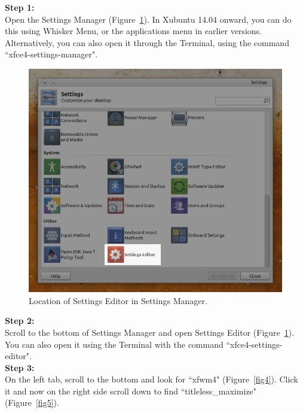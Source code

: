 \documentclass[12pt, a4paper]{article}
\begin{document}
\noindent \textbf{Step 1:}\\

\noindent Open the Settings Manager (Figure~\ref{fig3}). In Xubuntu 14.04 onward, you can do this using Whisker Menu, or the applications menu in earlier versions. Alternatively, you can also open it through the Terminal, using the command ``xfce4-settings-manager".

\begin{figure}[h]
  \centering
  \includegraphics[width=1\textwidth]{imgs/3settingsmanager.png}
  \caption{Location of Settings Editor in Settings Manager.}
  \label{fig3}
\end{figure}

\newpage
\noindent \textbf{Step 2:}\\

\noindent Scroll to the bottom of Settings Manager and open Settings Editor (Figure~\ref{fig3}). You can also open it using the Terminal with the command ``xfce4-settings-editor".\\

\noindent \textbf{Step 3:}\\

\noindent On the left tab, scroll to the bottom and look for ``xfwm4" (Figure~\ref{fig4}). Click it and now on the right side scroll down to find ``titleless\_maximize" (Figure~\ref{fig5}).
\end{document}
